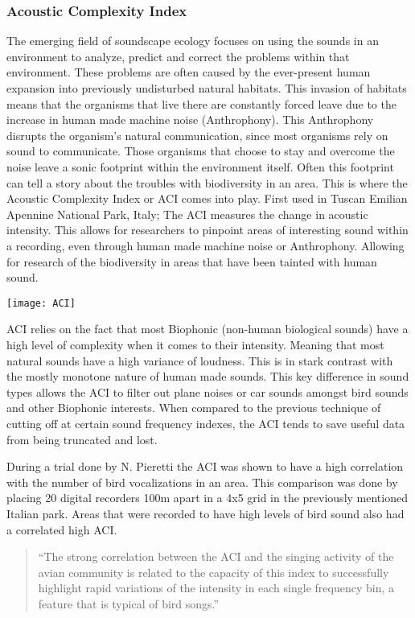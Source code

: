 \subsubsection{Acoustic Complexity Index}
\par The emerging field of soundscape ecology focuses on using the sounds in an environment to analyze, predict and correct the problems within that environment. These problems are often caused by the ever-present human expansion into previously undisturbed natural habitats. This invasion of habitats means that the organisms that live there are constantly forced leave due to the increase in human made machine noise (Anthrophony). This Anthrophony disrupts the organism's natural communication, since most organisms rely on sound to communicate. Those organisms that choose to stay and overcome the noise leave a sonic footprint within the environment itself. Often this footprint can tell a story about the troubles with biodiversity in an area. This is where the Acoustic Complexity Index or ACI comes into play. First used in Tuscan Emilian Apennine National Park, Italy; The ACI measures the change in acoustic intensity. This allows for researchers to pinpoint areas of interesting sound within a recording, even through human made machine noise or Anthrophony. Allowing for research of the biodiversity in areas that have been tainted with human sound.
\begin{center}
  \texttt{[image: ACI]} \\[12pt]
\end{center}
\par ACI relies on the fact that most Biophonic (non-human biological sounds) have a high level of complexity when it comes to their intensity. Meaning that most natural sounds have a high variance of loudness. This is in stark contrast with the mostly monotone nature of human made sounds. This key difference in sound types allows the ACI to filter out plane noises or car sounds amongst bird sounds and other Biophonic interests. When compared to the previous technique of cutting off at certain sound frequency indexes, the ACI tends to save useful data from being truncated and lost.
\par During a trial done by N. Pieretti the ACI was shown to have a high correlation with the number of bird vocalizations in an area. This comparison was done by placing 20 digital recorders 100m apart in a 4x5 grid in the previously mentioned Italian park. Areas that were recorded to have high levels of bird sound also had a correlated high ACI.
\begin{quote}
 ``The strong correlation between the ACI and the singing activity of the avian community
  is related to the capacity of this index to successfully highlight rapid variations of the
  intensity in each single frequency bin, a feature that is typical of bird songs.''\cite{pieretti}
\end{quote}

